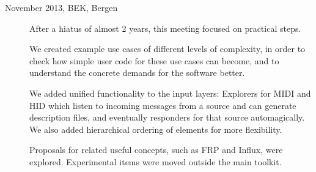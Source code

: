 \documentclass{article}
\begin{document}
\begin{description}
%	



	\item[November 2013, BEK, Bergen] After a hiatus of almost 2 years, this meeting focused on practical steps. 

	We created example use cases of different levels of complexity, in order to check how simple user code for these use cases can become, and to understand the concrete demands for the software better. 

We added unified functionality to the input layers: Explorers for MIDI and HID which listen to incoming messages from a source and can generate description files, and eventually responders for that source automagically. We also added hierarchical ordering of elements for more flexibility. 

Proposals for related useful concepts, such as FRP and Influx, were explored. Experimental items were moved outside the main toolkit.


\end{description}
\end{document}

